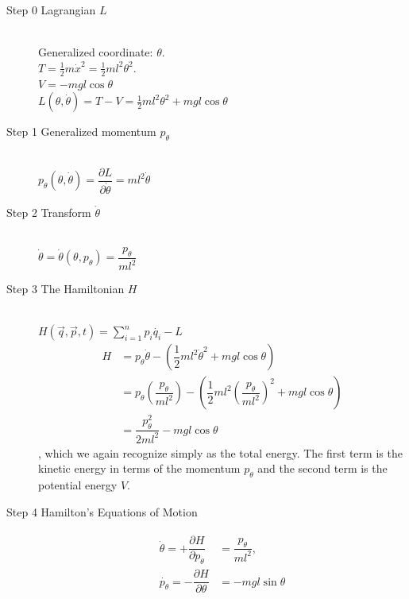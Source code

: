 \begin{description}
\item[Step 0 \quad Lagrangian $L$] \ \\[0.5cm]
Generalized coordinate: $\theta$. \\[0.2cm]
$T = \frac{1}{2} m \dot{x}^2 = \frac{1}{2} m l^2 \theta^2.$ \\[0.2cm]
$V = -m g l \cos{\theta}$ \\[0.2cm]
$L(\theta, \dot{\theta}) = T - V = \frac{1}{2} m l^2 \theta^2 + m g l \cos{\theta}$

\item[Step 1 \quad Generalized momentum $p_\theta$] \ \\[0.2cm]
$p_\theta(\theta,\dot{\theta}) = \dfrac{\partial L}{\partial \dot{\theta}} = m l^2 \dot{\theta}$

\item[Step 2 \quad Transform $\dot{\theta}$] \ \\[0.5cm]
$\dot{\theta} = \dot{\theta}(\theta, p_\theta) = \dfrac{p_\theta}{m l^2}$

\item[Step 3 \quad The Hamiltonian $H$] \ \\[0.5cm]
$H(\vec{q}, \vec{p}, t) = \sum\limits_{i=1}^n p_i \dot{q_i} - L$ \\[0.5cm]
\begin{align}
\nonumber H &= p_\theta \dot{\theta} - \left(\dfrac{1}{2} m l^2 \dot{\theta}^2 + m g l \cos{\theta}\right) \\
\nonumber &= p_\theta \left(\dfrac{p_\theta}{m l^2} \right) - \left(\dfrac{1}{2} m l^2 \left(\dfrac{p_\theta}{m l^2}\right)^2 + m g l \cos{\theta}\right) \\
&= \dfrac{p_\theta^2}{2 m l^2} - m g l \cos{\theta}
\end{align} 
, which we again recognize simply as the total energy. The first term is the kinetic energy in terms of the momentum $p_\theta$ and the second term is the potential energy $V$.

\item[Step 4 \quad Hamilton's Equations of Motion]
\begin{align}
\begin{split}
\label{eq:pe-eom}
\dot{\theta} = +\dfrac{\partial H}{\partial p_\theta} &= \dfrac{p_\theta}{m l^2} ,
\\[0.2cm]
\dot{p_\theta} = -\dfrac{\partial H}{\partial \theta} &= - m g l \sin{\theta}
\end{split}
\end{align}
\end{description}


